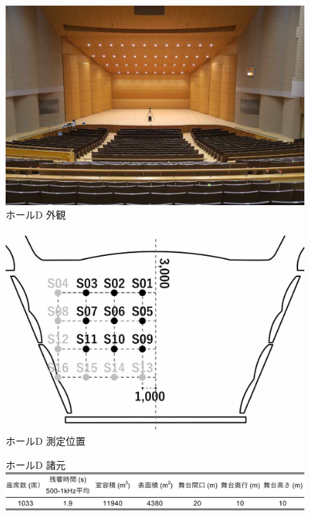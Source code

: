 \documentclass[11pt,a4j]{jreport}
\begin{document}
\newpage
\begin{figure}[H]
  \begin{minipage}{.5\linewidth} %
    \centering
    \includegraphics[width=.7\linewidth]{images/measuredHalls/resized/picture_d.jpg}
    \\ホールD 外観
  \end{minipage}%
  \begin{minipage}{.5\linewidth} %
    \centering
    \includegraphics[width=.7\linewidth]{images/measuredHalls/resized/flat_d.jpg}
    \\ホールD 測定位置
  \end{minipage}

  \begin{minipage}{1\linewidth}
    \centering
    ホールD 諸元\\
    \includegraphics[width=.8\linewidth]{images/measuredHalls/informationTable/d.pdf}
  \end{minipage}
\end{figure}
\end{document}
